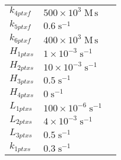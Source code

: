 \documentclass[a4paper,10.0pt]{article}
\begin{document}
{\begin{longtabu}{| l l l |}
  $k_{4 ptxf}$\hspace{0.5cm} & $500\!\times\!10 ^{3}\;\mathrm{M}\,\mathrm{s}$\hspace{0.5cm} & \hspace{0.5cm}\\
  $k_{5 ptxf}$\hspace{0.5cm} & $0.6\;\mathrm{s}^{-1}$\hspace{0.5cm} & \hspace{0.5cm}\\
  $k_{6 ptxf}$\hspace{0.5cm} & $400\!\times\!10 ^{3}\;\mathrm{M}\,\mathrm{s}$\hspace{0.5cm} & \hspace{0.5cm}\\
  $H_{1 ptxs}$\hspace{0.5cm} & $1\!\times\!10 ^{-3}\;\mathrm{s}^{-1}$\hspace{0.5cm} & \hspace{0.5cm}\\
  $H_{2 ptxs}$\hspace{0.5cm} & $10\!\times\!10 ^{-3}\;\mathrm{s}^{-1}$\hspace{0.5cm} & \hspace{0.5cm}\\
  $H_{3 ptxs}$\hspace{0.5cm} & $0.5\;\mathrm{s}^{-1}$\hspace{0.5cm} & \hspace{0.5cm}\\
  $H_{4 ptxs}$\hspace{0.5cm} & $0\;\mathrm{s}^{-1}$\hspace{0.5cm} & \hspace{0.5cm}\\
  $L_{1 ptxs}$\hspace{0.5cm} & $100\!\times\!10 ^{-6}\;\mathrm{s}^{-1}$\hspace{0.5cm} & \hspace{0.5cm}\\
  $L_{2 ptxs}$\hspace{0.5cm} & $4\!\times\!10 ^{-3}\;\mathrm{s}^{-1}$\hspace{0.5cm} & \hspace{0.5cm}\\
  $L_{3 ptxs}$\hspace{0.5cm} & $0.5\;\mathrm{s}^{-1}$\hspace{0.5cm} & \hspace{0.5cm}\\
  $k_{1 ptxs}$\hspace{0.5cm} & $0.3\;\mathrm{s}^{-1}$\hspace{0.5cm} & \hspace{0.5cm}\\

\end{longtabu}}
\end{document}
